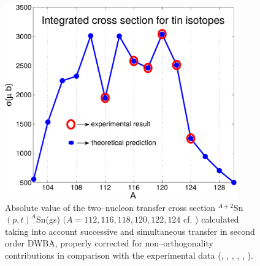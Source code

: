 %



  \begin{figure}[h!]
  \centerline{\includegraphics*[width=10cm,angle=0]{nutshell/figs/cross_strength.pdf}}
  \caption{Absolute value of the  two--nucleon transfer cross section $^{A+2}$Sn$(p,t)^A$Sn(gs) $(A=112,116,118,120,122,124$ cf. \cite{Potel:13} \cite{Potel:13b}) calculated taking into account successive and simultaneous transfer in second order DWBA, properly corrected for non--orthogonality contributions in comparison with the experimental data (\cite{Guazzoni:99}, \cite{Guazzoni:04}, \cite{Guazzoni:06}, \cite{Guazzoni:08}, \cite{Guazzoni:11}, \cite{Guazzoni:12}).}\label{fig1.5}
  \end{figure}





